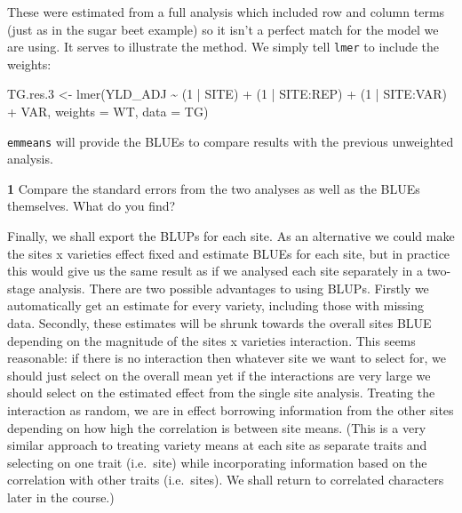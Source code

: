 \documentclass[
]{book}
\makeatletter
\newenvironment{Shaded}{\begin{snugshade}}{\end{snugshade}}
\newcommand{\AttributeTok}[1]{\textcolor[rgb]{0.77,0.63,0.00}{#1}}
\newcommand{\DecValTok}[1]{\textcolor[rgb]{0.00,0.00,0.81}{#1}}
\newcommand{\FloatTok}[1]{\textcolor[rgb]{0.00,0.00,0.81}{#1}}
\newcommand{\FunctionTok}[1]{\textcolor[rgb]{0.00,0.00,0.00}{#1}}
\newcommand{\NormalTok}[1]{#1}
\newcommand{\OtherTok}[1]{\textcolor[rgb]{0.56,0.35,0.01}{#1}}
\newcommand{\SpecialCharTok}[1]{\textcolor[rgb]{0.00,0.00,0.00}{#1}}
\newenvironment{kframe}{%
\medskip{}
\setlength{\fboxsep}{.8em}
 \def\at@end@of@kframe{}%
 \ifinner\ifhmode%
  \def\at@end@of@kframe{\end{minipage}}%
  \begin{minipage}{\columnwidth}%
 \fi\fi%
 \def\FrameCommand##1{\hskip\@totalleftmargin \hskip-\fboxsep
 \colorbox{shadecolor}{##1}\hskip-\fboxsep
     \hskip-\linewidth \hskip-\@totalleftmargin \hskip\columnwidth}%
 \MakeFramed {\advance\hsize-\width
   \@totalleftmargin\z@ \linewidth\hsize
   \@setminipage}}%
 {\par\unskip\endMakeFramed%
 \at@end@of@kframe}
\newenvironment{rmdblock}[1]
  {
  \begin{itemize}
  \renewcommand{\labelitemi}{
    \raisebox{-.7\height}[0pt][0pt]{
      {\setkeys{Gin}{width=3em,keepaspectratio}\texttt{[image: images/\#1]}}
    }
  }
  \setlength{\fboxsep}{1em}
  \begin{kframe}
  \item
  }
  {
  \end{kframe}
  \end{itemize}
  }
\newenvironment{rmdquiz}
  {\begin{rmdblock}{quiz}}
  {\end{rmdblock}}
\makeatother
\begin{document}
These were estimated from a full analysis which included row and column terms (just as in the sugar beet example) so it isn't a perfect match for the model we are using. It serves to illustrate the method. We simply tell \texttt{lmer} to include the weights:

\begin{Shaded}
\begin{Highlighting}[]
\NormalTok{TG.res}\FloatTok{.3} \OtherTok{\textless{}{-}} \FunctionTok{lmer}\NormalTok{(YLD\_ADJ }\SpecialCharTok{\textasciitilde{}}\NormalTok{ (}\DecValTok{1} \SpecialCharTok{|}\NormalTok{ SITE) }\SpecialCharTok{+}\NormalTok{ (}\DecValTok{1} \SpecialCharTok{|}\NormalTok{ SITE}\SpecialCharTok{:}\NormalTok{REP) }\SpecialCharTok{+}\NormalTok{ (}\DecValTok{1} \SpecialCharTok{|} 
\NormalTok{    SITE}\SpecialCharTok{:}\NormalTok{VAR) }\SpecialCharTok{+}\NormalTok{ VAR, }\AttributeTok{weights =}\NormalTok{ WT, }\AttributeTok{data =}\NormalTok{ TG)}
\end{Highlighting}
\end{Shaded}

\texttt{emmeans} will provide the BLUEs to compare results with the previous unweighted analysis.

\begin{rmdquiz}
\textbf{1} Compare the standard errors from the two analyses as well as the BLUEs themselves. What do you find?
\end{rmdquiz}

Finally, we shall export the BLUPs for each site. As an alternative we could make the sites x varieties effect fixed and estimate BLUEs for each site, but in practice this would give us the same result as if we analysed each site separately in a two-stage analysis. There are two possible advantages to using BLUPs. Firstly we automatically get an estimate for every variety, including those with missing data. Secondly, these estimates will be shrunk towards the overall sites BLUE depending on the magnitude of the sites x varieties interaction. This seems reasonable: if there is no interaction then whatever site we want to select for, we should just select on the overall mean yet if the interactions are very large we should select on the estimated effect from the single site analysis. Treating the interaction as random, we are in effect borrowing information from the other sites depending on how high the correlation is between site means. (This is a very similar approach to treating variety means at each site as separate traits and selecting on one trait (i.e.~site) while incorporating information based on the correlation with other traits (i.e.~sites). We shall return to correlated characters later in the course.)
\end{document}
